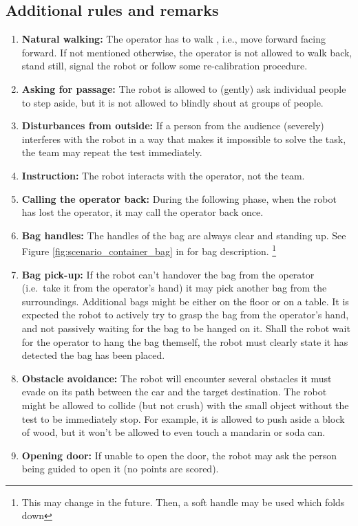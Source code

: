 \subsection{Additional rules and remarks}
\begin{enumerate}
  \item \textbf{Natural walking:} The operator has to walk , i.e., move forward facing forward. If not mentioned otherwise, the operator is not allowed to walk back, stand still, signal the robot or follow some re-calibration procedure.

  \item \textbf{Asking for passage:} The robot is allowed to (gently) ask individual people to step aside, but it is not allowed to blindly shout at groups of people.

  \item \textbf{Disturbances from outside:} If a person from the audience (severely) interferes with the robot in a way that makes it impossible to solve the task, the team may repeat the test immediately.

  \item \textbf{Instruction:} The robot interacts with the operator, not the team.

  \item \textbf{Calling the operator back:} During the following phase, when the robot has lost the operator, it may call the operator back once.

  \item \textbf{Bag handles:} The handles of the bag are always clear and standing up. See Figure \ref{fig:scenario_container_bag} in  for bag description. \footnote{This may change in the future. Then, a soft handle may be used which folds down}
  
  \item \textbf{Bag pick-up:} If the robot can't handover the bag from the operator (i.e.~take it from the operator's hand) it may pick another bag from the surroundings. Additional bags might be either on the floor or on a table. It is expected the robot to actively try to grasp the bag from the operator's hand, and not passively waiting for the bag to be hanged on it. Shall the robot wait for the operator to hang the bag themself, the robot must clearly state it has detected the bag has been placed.

  \item \textbf{Obstacle avoidance:} The robot will encounter several obstacles it must evade on its path between the car and the target destination.
  The robot might be allowed to collide (but not crush) with the small object without the test to be immediately stop. For example, it is allowed to push aside a block of wood, but it won't be allowed to even touch a mandarin or soda can.

  \item \textbf{Opening door:} If unable to open the door, the robot may ask the person being guided to open it (no points are scored).

\end{enumerate}

